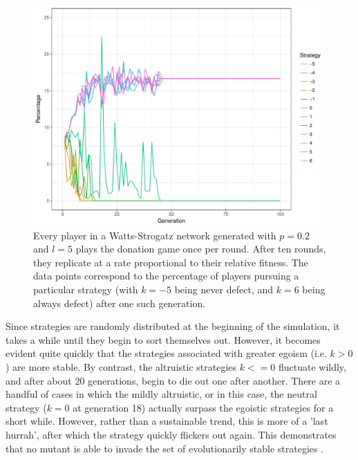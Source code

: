 \documentclass[12pt]{article}
\begin{document}
\begin{figure}
	\centering
	\includegraphics[width=\linewidth]{../figures/results_WS_300_p02.pdf}
	\caption{Every player in a Watts-Strogatz network generated with $p=0.2$ and $l=5$ plays the donation game once per round. After ten rounds, they replicate at a rate proportional to their relative fitness. The data points correspond to the percentage of players pursuing a particular strategy (with $k=-5$ being never defect, and $k=6$ being always defect) after one such generation.}
	\label{WS_300_p_03}
\end{figure}

Since strategies are randomly distributed at the beginning of the simulation, it takes a while until they begin to sort themselves out. However, it becomes evident quite quickly that the strategies associated with greater egoism (i.e. $k>0$) are more stable. By contrast, the altruistic strategies $k<=0$ fluctuate wildly, and after about 20 generations, begin to die out one after another. There are a handful of cases in which the mildly altruistic, or in this case, the neutral strategy ($k=0$ at generation 18) actually surpass the egoistic strategies for a short while. However, rather than a sustainable trend, this is more of a 'last hurrah', after which the strategy quickly flickers out again. This demonstrates that no mutant is able to invade the set of evolutionarily stable strategies \citep{hamilton1964_2}.

\end{document}
